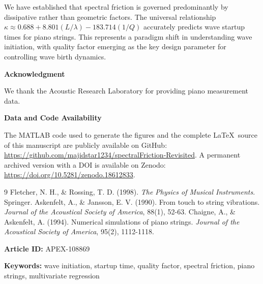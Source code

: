 \documentclass[twocolumn]{article}
\begin{document}
We have established that spectral friction is governed predominantly by dissipative rather than geometric factors. The universal relationship $\kappa \approx 0.688 + 8.801(L/\lambda) - 183.714(1/Q)$ accurately predicts wave startup times for piano strings. This represents a paradigm shift in understanding wave initiation, with quality factor emerging as the key design parameter for controlling wave birth dynamics.

\vspace{1em}
\noindent\textbf{Acknowledgment}

We thank the Acoustic Research Laboratory for providing piano measurement data.

\vspace{1em}
\noindent\textbf{Data and Code Availability}

The MATLAB code used to generate the figures and the complete \LaTeX\ source of this manuscript are publicly available on GitHub: 
\url{https://github.com/majidstar1234/spectralFriction-Revisited}. 
A permanent archived version with a DOI is available on Zenodo: 
\url{https://doi.org/10.5281/zenodo.18612833}.

\begin{thebibliography}{9}
 Fletcher, N. H., \& Rossing, T. D. (1998). \textit{The Physics of Musical Instruments}. Springer.
 Askenfelt, A., \& Jansson, E. V. (1990). From touch to string vibrations. \textit{Journal of the Acoustical Society of America}, 88(1), 52-63.
 Chaigne, A., \& Askenfelt, A. (1994). Numerical simulations of piano strings. \textit{Journal of the Acoustical Society of America}, 95(2), 1112-1118.
\end{thebibliography}

\noindent\textbf{Article ID:} APEX-108869

\noindent\textbf{Keywords:} wave initiation, startup time, quality factor, spectral friction, piano strings, multivariate regression
\end{document}

